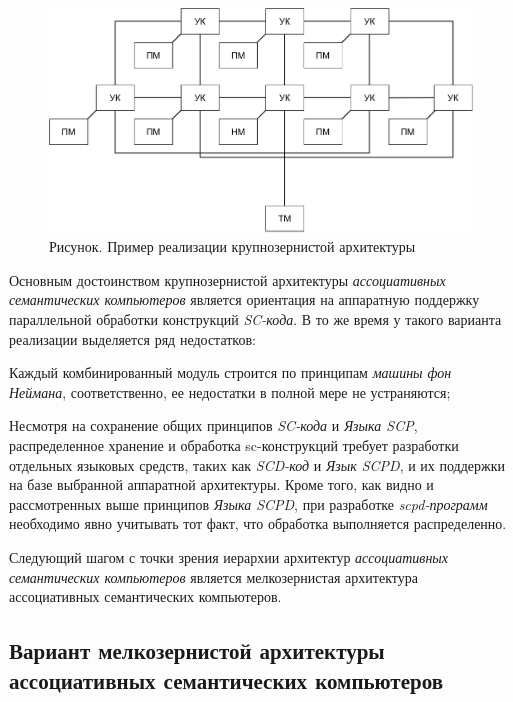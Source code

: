 \begin{figure}[H]
	\includegraphics[scale=0.7]{images/part6/chapter_computer/coarse-grained architecture.pdf}
	\caption{Рисунок. Пример реализации крупнозернистой архитектуры}
	\label{fig:coarse-grained-architecture}
\end{figure}

Основным достоинством крупнозернистой архитектуры \textit{ассоциативных семантических компьютеров} является ориентация на аппаратную поддержку параллельной обработки конструкций \textit{SC-кода}. В то же время у такого варианта реализации выделяется ряд недостатков:
\begin{textitemize}
	\item Каждый комбинированный модуль строится по принципам \textit{машины фон Неймана}, соответственно, ее недостатки в полной мере не устраняются;
	\item Несмотря на сохранение общих принципов \textit{SC-кода} и \textit{Языка SCP}, распределенное хранение и обработка sc-конструкций требует разработки отдельных языковых средств, таких как \textit{SCD-код} и \textit{Язык SCPD}, и их поддержки на базе выбранной аппаратной архитектуры. Кроме того, как видно и рассмотренных выше принципов \textit{Языка SCPD}, при разработке \textit{scpd-программ} необходимо явно учитывать тот факт, что обработка выполняется распределенно.
\end{textitemize}	

Следующий шагом с точки зрения иерархии архитектур \textit{ассоциативных семантических компьютеров} является мелкозернистая архитектура ассоциативных семантических компьютеров.

\subsection{Вариант мелкозернистой архитектуры ассоциативных семантических компьютеров}
\label{subsec_comp_fine}

